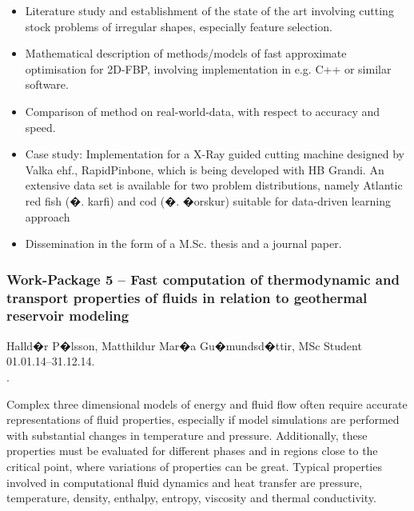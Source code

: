 \documentclass[12pt,a4paper]{article}
\begin{document}
\begin{itemize}
\item         Literature study and establishment of the state of the art involving cutting stock problems of irregular 
shapes, especially feature selection.
\item         Mathematical description of methods/models of fast approximate optimisation for 2D-FBP, involving 
implementation in e.g. C++ or similar software.
\item         Comparison of method on real-world-data, with respect to accuracy and speed.
\item         Case study: Implementation for a X-Ray guided cutting machine designed by Valka ehf., RapidPinbone, 
which is being developed with HB Grandi. An extensive data set is available for two problem distributions, namely 
Atlantic red fish (�. karfi) and cod (�. �orskur) suitable for data-driven learning approach
\item         Dissemination in the form of a M.Sc. thesis and a journal paper.
\end{itemize}


\subsubsection*{Work-Package 5 -- Fast computation of thermodynamic and transport properties of fluids in relation to 
geothermal reservoir modeling}

 Halld�r P�lsson, Matthildur Mar�a Gu�mundsd�ttir, MSc Student\\
 01.01.14--31.12.14.\\
 .

Complex three dimensional models of energy and fluid flow often require accurate representations of fluid properties, 
especially if model simulations are performed with substantial changes in temperature and pressure.  Additionally, 
these properties must be evaluated for different phases and in regions close to the critical point, where variations 
of properties can be great.  Typical properties involved in computational fluid dynamics and heat transfer are 
pressure, temperature, density, enthalpy, entropy, viscosity and thermal conductivity.
\end{document}
